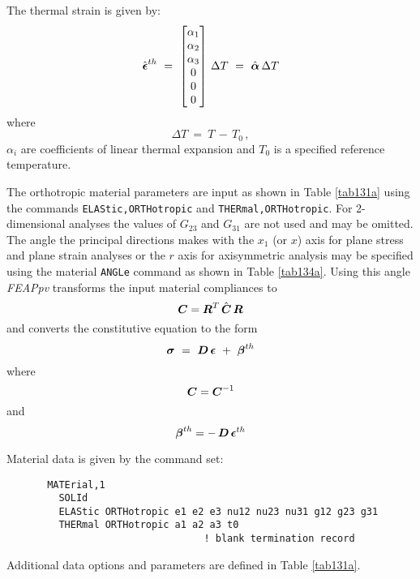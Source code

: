 The thermal strain is given by:
\begin{equation}
\hat{\boldsymbol{\epsilon}}^{th} ~=~ \left[
\begin{matrix}
\alpha_1 \\ \alpha_2 \\ \alpha_3 \\ 0 \\ 0 \\ 0 \\
\end{matrix} \right]
\, \Delta T ~=~ \hat{\boldsymbol{\alpha}} \, \Delta T
\end{equation}
where
\begin{equation}
\Delta T ~=~ T\, - \, T_0 \, ,
\end{equation}
$\alpha_i$ are coefficients of linear thermal expansion and
$T_0$ is a specified reference temperature.

The orthotropic material parameters are input as shown in Table \ref{tab131a}
using the commands {\tt ELAStic,ORTHotropic} and {\tt THERmal,ORTHotropic}.
For 2-dimensional analyses the values of $G_{23}$ and $G_{31}$ are not used
and may be omitted.
The angle the principal directions makes with the $x_1$ (or $x$)
axis for plane stress
and plane strain analyses or the $r$ axis for axisymmetric analysis may be
specified using the material {\tt ANGLe} command
as shown in Table \ref{tab134a}.
Using this angle {\sl FEAPpv} transforms the input material compliances to
\begin{equation}
\boldsymbol{C} = \boldsymbol{R}^T \, \hat{\boldsymbol{C}} \, \boldsymbol{R}
\end{equation}
and converts the constitutive equation to the form
\begin{equation}
\boldsymbol{\sigma} ~=~ \boldsymbol{D} \, \boldsymbol{\epsilon} ~+~ {\boldsymbol{\beta}}^{th}
\end{equation}
where
\begin{equation}
\boldsymbol{C} = \boldsymbol{C}^{-1}
\end{equation}
and
\begin{equation}
{\boldsymbol{\beta}}^{th} = - \, \boldsymbol{D} \, {\boldsymbol{\epsilon}}^{th}
\end{equation}

Material data is given by the command set:
\begin{verbatim}
       MATErial,1
         SOLId
         ELAStic ORTHotropic e1 e2 e3 nu12 nu23 nu31 g12 g23 g31
         THERmal ORTHotropic a1 a2 a3 t0
                                  ! blank termination record
\end{verbatim}
Additional data options and parameters are defined in Table \ref{tab131a}.

